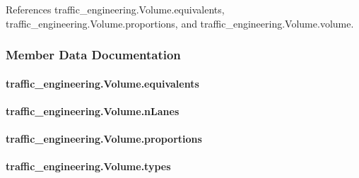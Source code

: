 References traffic\-\_\-engineering.\-Volume.\-equivalents, traffic\-\_\-engineering.\-Volume.\-proportions, and traffic\-\_\-engineering.\-Volume.\-volume.



\subsubsection{Member Data Documentation}
\hypertarget{classtraffic__engineering_1_1Volume_a013ff81533ded7ac63a8f0edb9d657b8}{
\paragraph[{equivalents}]{\setlength{\rightskip}{0pt plus 5cm}traffic\-\_\-engineering.\-Volume.\-equivalents}}\label{classtraffic__engineering_1_1Volume_a013ff81533ded7ac63a8f0edb9d657b8}
\hypertarget{classtraffic__engineering_1_1Volume_a217b8d4dd4b4fc2e3dd3d67abf8750f9}{
\paragraph[{n\-Lanes}]{\setlength{\rightskip}{0pt plus 5cm}traffic\-\_\-engineering.\-Volume.\-n\-Lanes}}\label{classtraffic__engineering_1_1Volume_a217b8d4dd4b4fc2e3dd3d67abf8750f9}
\hypertarget{classtraffic__engineering_1_1Volume_a7b512ba8743bffe101799d4eec54db8f}{
\paragraph[{proportions}]{\setlength{\rightskip}{0pt plus 5cm}traffic\-\_\-engineering.\-Volume.\-proportions}}\label{classtraffic__engineering_1_1Volume_a7b512ba8743bffe101799d4eec54db8f}
\hypertarget{classtraffic__engineering_1_1Volume_a80559ccd613b0cd6ec9e606abecb8b87}{
\paragraph[{types}]{\setlength{\rightskip}{0pt plus 5cm}traffic\-\_\-engineering.\-Volume.\-types}}\label{classtraffic__engineering_1_1Volume_a80559ccd613b0cd6ec9e606abecb8b87}
